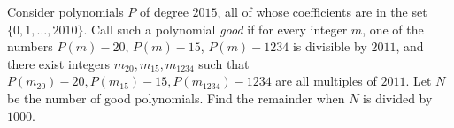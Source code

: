 Consider polynomials $P$ of degree $2015$, all of whose coefficients are in the set $\{0,1,\dots,2010\}$. Call such a polynomial \emph{good} if for every integer $m$, one of the numbers $P(m)-20$, $P(m)-15$, $P(m)-1234$ is divisible by $2011$, and there exist integers $m_{20}, m_{15}, m_{1234}$ such that $P(m_{20})-20, P(m_{15})-15, P(m_{1234})-1234$ are all multiples of $2011$. Let $N$ be the number of good polynomials. Find the remainder when $N$ is divided by $1000$.
